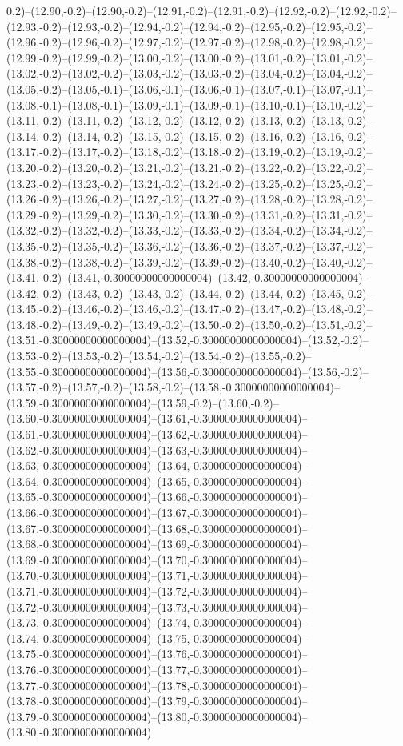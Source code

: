 0.2)--(12.90,-0.2)--(12.90,-0.2)--(12.91,-0.2)--(12.91,-0.2)--(12.92,-0.2)--(12.92,-0.2)--(12.93,-0.2)--(12.93,-0.2)--(12.94,-0.2)--(12.94,-0.2)--(12.95,-0.2)--(12.95,-0.2)--(12.96,-0.2)--(12.96,-0.2)--(12.97,-0.2)--(12.97,-0.2)--(12.98,-0.2)--(12.98,-0.2)--(12.99,-0.2)--(12.99,-0.2)--(13.00,-0.2)--(13.00,-0.2)--(13.01,-0.2)--(13.01,-0.2)--(13.02,-0.2)--(13.02,-0.2)--(13.03,-0.2)--(13.03,-0.2)--(13.04,-0.2)--(13.04,-0.2)--(13.05,-0.2)--(13.05,-0.1)--(13.06,-0.1)--(13.06,-0.1)--(13.07,-0.1)--(13.07,-0.1)--(13.08,-0.1)--(13.08,-0.1)--(13.09,-0.1)--(13.09,-0.1)--(13.10,-0.1)--(13.10,-0.2)--(13.11,-0.2)--(13.11,-0.2)--(13.12,-0.2)--(13.12,-0.2)--(13.13,-0.2)--(13.13,-0.2)--(13.14,-0.2)--(13.14,-0.2)--(13.15,-0.2)--(13.15,-0.2)--(13.16,-0.2)--(13.16,-0.2)--(13.17,-0.2)--(13.17,-0.2)--(13.18,-0.2)--(13.18,-0.2)--(13.19,-0.2)--(13.19,-0.2)--(13.20,-0.2)--(13.20,-0.2)--(13.21,-0.2)--(13.21,-0.2)--(13.22,-0.2)--(13.22,-0.2)--(13.23,-0.2)--(13.23,-0.2)--(13.24,-0.2)--(13.24,-0.2)--(13.25,-0.2)--(13.25,-0.2)--(13.26,-0.2)--(13.26,-0.2)--(13.27,-0.2)--(13.27,-0.2)--(13.28,-0.2)--(13.28,-0.2)--(13.29,-0.2)--(13.29,-0.2)--(13.30,-0.2)--(13.30,-0.2)--(13.31,-0.2)--(13.31,-0.2)--(13.32,-0.2)--(13.32,-0.2)--(13.33,-0.2)--(13.33,-0.2)--(13.34,-0.2)--(13.34,-0.2)--(13.35,-0.2)--(13.35,-0.2)--(13.36,-0.2)--(13.36,-0.2)--(13.37,-0.2)--(13.37,-0.2)--(13.38,-0.2)--(13.38,-0.2)--(13.39,-0.2)--(13.39,-0.2)--(13.40,-0.2)--(13.40,-0.2)--(13.41,-0.2)--(13.41,-0.30000000000000004)--(13.42,-0.30000000000000004)--(13.42,-0.2)--(13.43,-0.2)--(13.43,-0.2)--(13.44,-0.2)--(13.44,-0.2)--(13.45,-0.2)--(13.45,-0.2)--(13.46,-0.2)--(13.46,-0.2)--(13.47,-0.2)--(13.47,-0.2)--(13.48,-0.2)--(13.48,-0.2)--(13.49,-0.2)--(13.49,-0.2)--(13.50,-0.2)--(13.50,-0.2)--(13.51,-0.2)--(13.51,-0.30000000000000004)--(13.52,-0.30000000000000004)--(13.52,-0.2)--(13.53,-0.2)--(13.53,-0.2)--(13.54,-0.2)--(13.54,-0.2)--(13.55,-0.2)--(13.55,-0.30000000000000004)--(13.56,-0.30000000000000004)--(13.56,-0.2)--(13.57,-0.2)--(13.57,-0.2)--(13.58,-0.2)--(13.58,-0.30000000000000004)--(13.59,-0.30000000000000004)--(13.59,-0.2)--(13.60,-0.2)--(13.60,-0.30000000000000004)--(13.61,-0.30000000000000004)--(13.61,-0.30000000000000004)--(13.62,-0.30000000000000004)--(13.62,-0.30000000000000004)--(13.63,-0.30000000000000004)--(13.63,-0.30000000000000004)--(13.64,-0.30000000000000004)--(13.64,-0.30000000000000004)--(13.65,-0.30000000000000004)--(13.65,-0.30000000000000004)--(13.66,-0.30000000000000004)--(13.66,-0.30000000000000004)--(13.67,-0.30000000000000004)--(13.67,-0.30000000000000004)--(13.68,-0.30000000000000004)--(13.68,-0.30000000000000004)--(13.69,-0.30000000000000004)--(13.69,-0.30000000000000004)--(13.70,-0.30000000000000004)--(13.70,-0.30000000000000004)--(13.71,-0.30000000000000004)--(13.71,-0.30000000000000004)--(13.72,-0.30000000000000004)--(13.72,-0.30000000000000004)--(13.73,-0.30000000000000004)--(13.73,-0.30000000000000004)--(13.74,-0.30000000000000004)--(13.74,-0.30000000000000004)--(13.75,-0.30000000000000004)--(13.75,-0.30000000000000004)--(13.76,-0.30000000000000004)--(13.76,-0.30000000000000004)--(13.77,-0.30000000000000004)--(13.77,-0.30000000000000004)--(13.78,-0.30000000000000004)--(13.78,-0.30000000000000004)--(13.79,-0.30000000000000004)--(13.79,-0.30000000000000004)--(13.80,-0.30000000000000004)--(13.80,-0.30000000000000004)